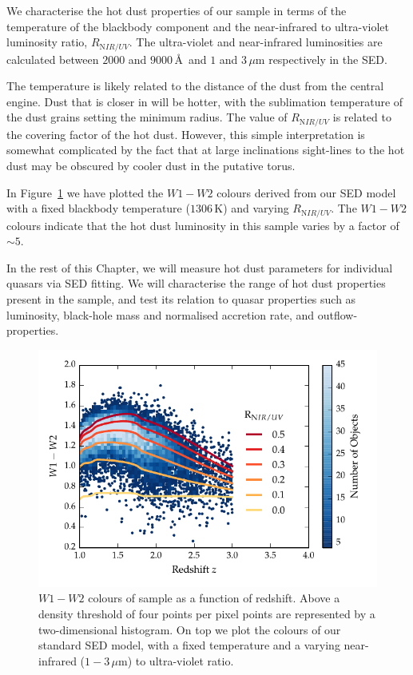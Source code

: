 We characterise the hot dust properties of our sample in terms of the temperature of the blackbody component and the near-infrared to ultra-violet luminosity ratio, $R_{\mathrm NIR/UV}$. 
The ultra-violet and near-infrared luminosities are calculated between $2000$ and $9000$\,\AA\, and $1$ and $3$\,$\mu$m respectively in the SED.

The temperature is likely related to the distance of the dust from the central engine.
Dust that is closer in will be hotter, with the sublimation temperature of the dust grains setting the minimum radius.  
The value of $R_{\mathrm NIR/UV}$ is related to the covering factor of the hot dust. 
However, this simple interpretation is somewhat complicated by the fact that at large inclinations sight-lines to the hot dust may be obscured by cooler dust in the putative torus. 

In Figure~\ref{fig:w1w2colorsratio} we have plotted the $W1-W2$ colours derived from our SED model with a fixed blackbody temperature ($1306$\,K) and varying $R_{\mathrm NIR/UV}$.
The $W1-W2$ colours indicate that the hot dust luminosity in this sample varies by a factor of $\sim5$. 

In the rest of this Chapter, we will measure hot dust parameters for individual quasars via SED fitting. 
We will characterise the range of hot dust properties present in the sample, and test its relation to quasar properties such as luminosity, black-hole mass and normalised accretion rate, and outflow-properties. 

\begin{figure}[t!]
\centering
\includegraphics[width=\columnwidth]{figures/chapter05/w1w2_versus_redshift_ratio.pdf}
\caption[{$W1 - W2$ colours of sample as a function of redshift.}]{$W1 - W2$ colours of sample as a function of redshift. Above a density threshold of four points per pixel points are represented by a two-dimensional histogram. On top we plot the colours of our standard SED model, with a fixed temperature and a varying near-infrared ($1 - 3$\,$\mu$m) to ultra-violet ratio.}
  \label{fig:w1w2colorsratio}
\end{figure}

